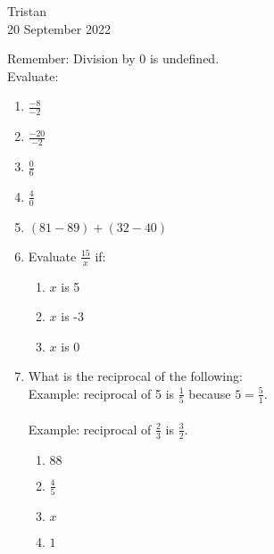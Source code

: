 \documentclass[14pt]{extarticle} %
\begin{document}
\hfill Tristan\\
\null\hfill 20 September 2022

\vspace{10mm}

Remember: Division by $0$ is undefined.\\
Evaluate:
\begin{enumerate}[label=\Alph*.), itemsep=\fill]
\item  $\frac{-8}{-2}$
\item  $\frac{-20}{-2}$
\item  $\frac{0}{6}$
\item  $\frac{4}{0}$
\item  $(81-89)+(32-40)$
\vfill\clearpage
\item Evaluate $\frac{15}{x}$ if:
    \begin{enumerate}[itemsep=\fill]
    \item $x$ is 5
    \item $x$ is -3
    \item $x$ is 0
    \vfill\end{enumerate}
\item What is the reciprocal of the following:\\
    Example: reciprocal of 5 is $\frac{1}{5}$ because $5 = \frac{5}{1}$.\\\\
    Example: reciprocal of $\frac{2}{3}$ is $\frac{3}{2}$.
    \begin{enumerate}[itemsep=\fill]
    \item $88$
    \item $\frac{4}{5}$
    \item $x$
    \item $1$
    \end{enumerate}
\vfill\end{enumerate}
\end{document}
